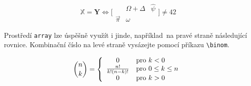 \documentclass[11pt, a4paper, twocolumn]{article}
\theoremstyle{definition}
\begin{document}
$$ \mathbb{X} = \textbf{Y} \iff \bigg[
\begin{array}{ccc}
     & \Omega + \Delta & \hat{\psi} \\
    \vec{\pi} & \omega & 
\end{array}
\bigg] \neq 42
$$

Prostředí \verb|array| lze úspěšně využít i jinde, například~na pravé straně následující rovnice. Kombinační číslo na levé straně vysázejte pomocí příkazu \verb|\binom|.

$$
\binom{n}{k} = \left\{
\begin{array}{c l}
     0 & \text{pro } k<0 \\
     \frac{n!}{k!(n-k)!} & \text{pro } 0 \leq k \leq n \\
     0 & \text{pro } k>0
\end{array} \right. $$
\end{document}
